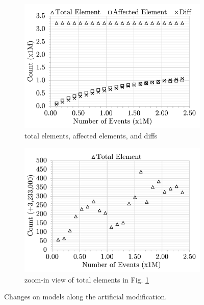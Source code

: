 \documentclass{jot}
\begin{document}
\begin{figure}[ht]
    \centering
    \begin{subfigure}[t]{0.495\linewidth}
        \includegraphics[width=\linewidth]{ModificationCourse}
        \caption{total elements, affected elements, and diffs}
        \label{fig:modification_course}
    \end{subfigure}
    \hfill
    \begin{subfigure}[t]{0.495\linewidth}
        \includegraphics[width=\linewidth]{ModelSize}
        \caption{zoom-in view of total elements in Fig. \ref{fig:modification_course}}
        \label{fig:model_size}
    \end{subfigure}
    \caption{Changes on models along the artificial modification.}
    \label{fig:modification_model_size}
\end{figure}
\end{document}
